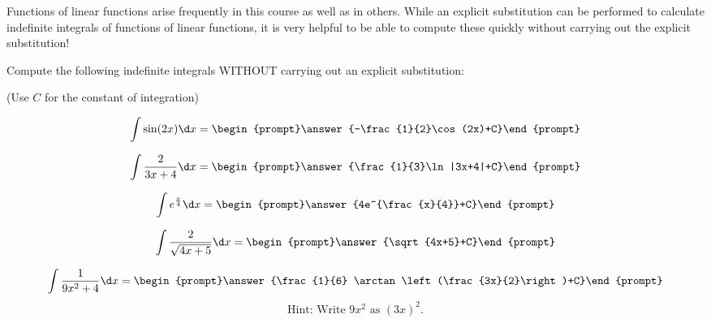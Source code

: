 \documentclass{ximera}
\author{Jim Talamo}
\begin{document}
\begin{exercise}

Functions of linear functions arise frequently in this course as well as in others.  While an explicit substitution can be performed to calculate indefinite integrals of functions of linear functions, it is very helpful to be able to compute these quickly without carrying out the explicit substitution!  

Compute the following indefinite integrals WITHOUT carrying out an explicit substitution:

\begin{prompt} (Use $C$ for the constant of integration) \end{prompt}

\[\int \sin(2x) \d x = \begin{prompt}\answer{-\frac{1}{2}\cos(2x)+C}\end{prompt}\]

\[\int \frac{2}{3x+4} \d x = \begin{prompt}\answer{\frac{1}{3}\ln|3x+4|+C}\end{prompt}\]

\[\int e^{\frac{x}{4}} \d x = \begin{prompt}\answer{4e^{\frac{x}{4}}+C}\end{prompt}\]

\[\int \frac{2}{\sqrt{4x+5}} \d x = \begin{prompt}\answer{\sqrt{4x+5}+C}\end{prompt}\]

\[\int \frac{1}{9x^2+4} \d x = \begin{prompt}\answer{\frac{1}{6} \arctan\left(\frac{3x}{2}\right)+C}\end{prompt}\]
\[\mbox{Hint: Write $9x^2$ as $(3x)^2$.}\]





\end{exercise}
\end{document}
